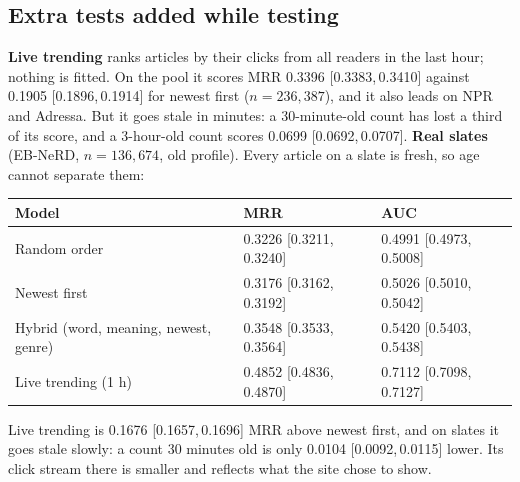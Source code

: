 \documentclass[11pt,a4paper]{article}
\newcommand{\ci}[2]{[#1,\,#2]}
\begin{document}
\subsection{Extra tests added while testing}
\textbf{Live trending} ranks articles by their clicks from all readers in the last hour; nothing is fitted. On the pool it scores MRR 0.3396 \ci{0.3383}{0.3410} against 0.1905 \ci{0.1896}{0.1914} for newest first ($n=236{,}387$), and it also leads on NPR and Adressa. But it goes stale in minutes: a 30-minute-old count has lost a third of its score, and a 3-hour-old count scores 0.0699 \ci{0.0692}{0.0707}. \textbf{Real slates} (EB-NeRD, $n=136{,}674$, old profile). Every article on a slate is fresh, so age cannot separate them:
\begin{center}\small
\setlength{\tabcolsep}{4pt}
\begin{tabular}{@{}lll@{}}
\toprule
Model & MRR & AUC\\
\midrule
Random order & 0.3226 \ci{0.3211}{0.3240} & 0.4991 \ci{0.4973}{0.5008}\\
Newest first & 0.3176 \ci{0.3162}{0.3192} & 0.5026 \ci{0.5010}{0.5042}\\
Hybrid (word, meaning, newest, genre) & 0.3548 \ci{0.3533}{0.3564} & 0.5420 \ci{0.5403}{0.5438}\\
Live trending (1 h) & 0.4852 \ci{0.4836}{0.4870} & 0.7112 \ci{0.7098}{0.7127}\\
\bottomrule
\end{tabular}
\end{center}
Live trending is 0.1676 \ci{0.1657}{0.1696} MRR above newest first, and on slates it goes stale slowly: a count 30 minutes old is only 0.0104 \ci{0.0092}{0.0115} lower. Its click stream there is smaller and reflects what the site chose to show.
\end{document}
